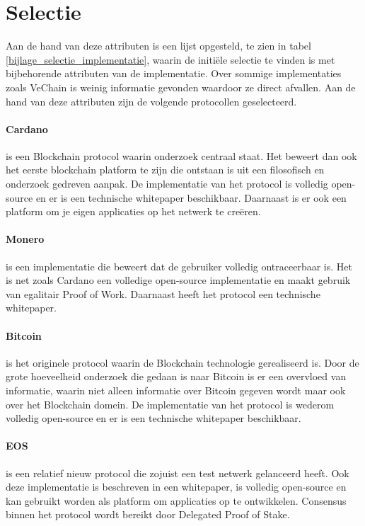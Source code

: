 \newpage
\section{Selectie}

Aan de hand van deze attributen is een lijst opgesteld, te zien in tabel \ref{bijlage_selectie_implementatie}, waarin de initiële selectie te vinden is met bijbehorende attributen van de implementatie. Over sommige implementaties zoals VeChain is weinig informatie gevonden waardoor ze direct afvallen. Aan de hand van deze attributen zijn de volgende protocollen geselecteerd.

\paragraph{Cardano} is een Blockchain protocol waarin onderzoek centraal staat. Het beweert dan ook het eerste blockchain platform te zijn die ontstaan is uit een filosofisch en onderzoek gedreven aanpak. De implementatie van het protocol is volledig open-source en er is een technische whitepaper beschikbaar. Daarnaast is er ook een platform om je eigen applicaties op het netwerk te creëren.

\paragraph{Monero} is een implementatie die beweert dat de gebruiker volledig ontraceerbaar is. Het is net zoals Cardano een volledige open-source implementatie en maakt gebruik van egalitair Proof of Work. Daarnaast heeft het protocol een technische whitepaper. 

\paragraph{Bitcoin} is het originele protocol waarin de Blockchain technologie gerealiseerd is. Door de grote hoeveelheid onderzoek die gedaan is naar Bitcoin is er een overvloed van informatie, waarin niet alleen informatie over Bitcoin gegeven wordt maar ook over het Blockchain domein. De implementatie van het protocol is wederom volledig open-source en er is een technische whitepaper beschikbaar.

\paragraph{EOS} is een relatief nieuw protocol die zojuist een test netwerk gelanceerd heeft. Ook deze implementatie is beschreven in een whitepaper, is volledig open-source en kan gebruikt worden als platform om applicaties op te ontwikkelen. Consensus binnen het protocol wordt bereikt door Delegated Proof of Stake.
